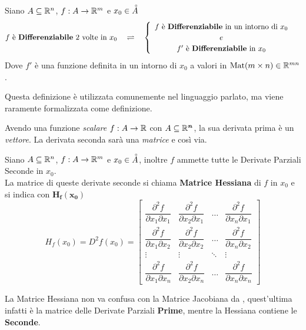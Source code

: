 \begin{definition}
	\label{def:differenz_second}
	Siano $A \subseteq \mathbb{R}^n$, $f:A \to \mathbb{R}^m$ e $x_0 \in \accentset{\circ}{A}$
	\[
		f \text{ è \textbf{Differenziabile} } 2 \text{ volte in } x_0
		\quad \rightleftharpoons \quad
		\begin{cases}
			\begin{array}{c}
				f \text{ è \textbf{Differenziabile} in un intorno di } x_0\\
				e\\
				f' \text{ è \textbf{Differenziabile} in } x_0
			\end{array}
		\end{cases}
	\]
	Dove $f'$ è una funzione definita in un intorno di $x_0$ a valori in $\operatorname{Mat}(m \times n) \in \mathbb{R}^{mn}$.
	\begin{note}
		Questa definizione è utilizzata comunemente nel linguaggio parlato, ma viene raramente formalizzata come definizione.
	\end{note}
	\begin{note}
		Avendo una funzione	\textit{scalare} $f: A \to \mathbb{R}$ con $A \subseteq \boldsymbol{\mathbb{R}^n}$, la sua derivata prima è un \textit{vettore}. La derivata seconda sarà una \textit{matrice} e così via.
	\end{note}
\end{definition}

\begin{definition}
	\label{def:hessiana}
	Siano $A \subseteq \mathbb{R}^n$, $f:A \to \mathbb{R}^m$ e $x_0 \in \accentset{\circ}{A}$, inoltre $f$ ammette tutte le Derivate Parziali Seconde in $x_0$.\\
	La matrice di queste derivate seconde si chiama \textbf{Matrice Hessiana} di $f$ in $x_0$ e si indica con $\boldsymbol{H_f(x_0)}$
	\[
		H_f(x_0) = D^2f(x_0) =
		\begin{bmatrix}
			\dfrac{\partial^2 f}{\partial x_1 \partial x_1} & \dfrac{\partial^2 f}{\partial x_2 \partial x_1} & \dots & \dfrac{\partial^2 f}{\partial x_n \partial x_1}\\[3ex]
			\dfrac{\partial^2 f}{\partial x_1 \partial x_2} & \dfrac{\partial^2 f}{\partial x_2 \partial x_2} & \dots & \dfrac{\partial^2 f}{\partial x_n \partial x_2}\\[3ex]
			\vdots & \vdots & \ddots & \vdots\\[3ex]
			\dfrac{\partial^2 f}{\partial x_1 \partial x_n} & \dfrac{\partial^2 f}{\partial x_2 \partial x_n} & \dots & \dfrac{\partial^2 f}{\partial x_n \partial x_n}
		\end{bmatrix}
	\]
	\begin{note}
		La Matrice Hessiana non va confusa con la Matrice Jacobiana da , quest'ultima infatti è la matrice delle Derivate Parziali \textbf{Prime}, mentre la Hessiana contiene le \textbf{Seconde}.
	\end{note}
\end{definition}

